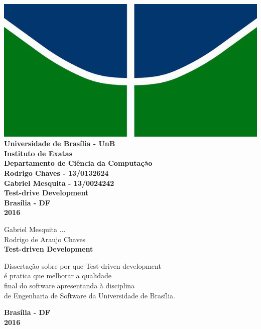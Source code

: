 \documentclass{article}
\begin{document}
    \begin{center}
    \includegraphics[scale=0.5]{unb}
    \vspace{15mm}
    \textbf{Universidade de Brasília - UnB}\\
    \textbf{Instituto de Exatas}\\
    \textbf{Departamento de Ciência da Computação}\\
    \vspace{15mm}
    \textbf{Rodrigo Chaves - 13/0132624}\\
    \textbf{Gabriel Mesquita - 13/0024242}\\
    \vspace{15mm}
    \textbf{Test-drive Development}\\
    \vspace{15mm}
    \textbf{Brasília - DF}\\
    \textbf{2016}
  \end{center}

  \clearpage

  \begin{center}
    Gabriel Mesquita ...\\
    Rodrigo de Araujo Chaves\\
    \vspace{30mm}
    \textbf{Test-driven Development}
    \vspace{30mm}
    \begin{flushright}
      Dissertação sobre por que Test-driven development\\
      é pratica que melhorar a qualidade\\
      final do software apresentanda à disciplina\\
      de Engenharia de Software da Universidade de Brasília.\\
    \end{flushright}
    \vspace{60mm}
    \textbf{Brasília - DF}\\
    \textbf{2016}
  \end{center}
\end{document}
